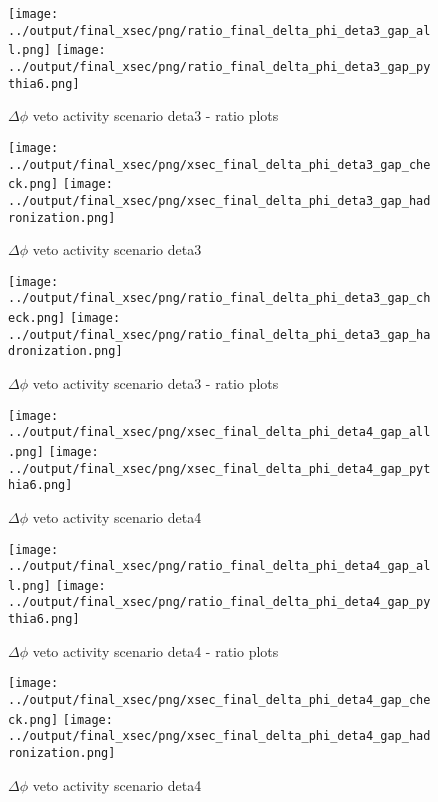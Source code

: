 \documentclass[11pt]{article}
\begin{document}
\begin{figure}[ht]
\centering
\texttt{[image: ../output/final\_xsec/png/ratio\_final\_delta\_phi\_deta3\_gap\_all.png]}
\texttt{[image: ../output/final\_xsec/png/ratio\_final\_delta\_phi\_deta3\_gap\_pythia6.png]}
\caption{$\Delta\phi$ veto activity scenario deta3 - ratio plots}
\label{fig:delta_phi_gap_deta3_ratio}
\end{figure}

\begin{figure}[ht]
\centering
\texttt{[image: ../output/final\_xsec/png/xsec\_final\_delta\_phi\_deta3\_gap\_check.png]}
\texttt{[image: ../output/final\_xsec/png/xsec\_final\_delta\_phi\_deta3\_gap\_hadronization.png]}
\caption{$\Delta\phi$ veto activity scenario deta3}
\label{fig:delta_phi_gap_deta3b}
\end{figure}

\begin{figure}[ht]
\centering
\texttt{[image: ../output/final\_xsec/png/ratio\_final\_delta\_phi\_deta3\_gap\_check.png]}
\texttt{[image: ../output/final\_xsec/png/ratio\_final\_delta\_phi\_deta3\_gap\_hadronization.png]}
\caption{$\Delta\phi$ veto activity scenario deta3 - ratio plots}
\label{fig:delta_phi_gap_deta3b_ratio}
\end{figure}

\begin{figure}[ht]
\centering
\texttt{[image: ../output/final\_xsec/png/xsec\_final\_delta\_phi\_deta4\_gap\_all.png]}
\texttt{[image: ../output/final\_xsec/png/xsec\_final\_delta\_phi\_deta4\_gap\_pythia6.png]}
\caption{$\Delta\phi$ veto activity scenario deta4}
\label{fig:delta_phi_gap_deta4}
\end{figure}

\begin{figure}[ht]
\centering
\texttt{[image: ../output/final\_xsec/png/ratio\_final\_delta\_phi\_deta4\_gap\_all.png]}
\texttt{[image: ../output/final\_xsec/png/ratio\_final\_delta\_phi\_deta4\_gap\_pythia6.png]}
\caption{$\Delta\phi$ veto activity scenario deta4 - ratio plots}
\label{fig:delta_phi_gap_deta4_ratio}
\end{figure}

\begin{figure}[ht]
\centering
\texttt{[image: ../output/final\_xsec/png/xsec\_final\_delta\_phi\_deta4\_gap\_check.png]}
\texttt{[image: ../output/final\_xsec/png/xsec\_final\_delta\_phi\_deta4\_gap\_hadronization.png]}
\caption{$\Delta\phi$ veto activity scenario deta4}
\label{fig:delta_phi_gap_deta4b}
\end{figure}
\end{document}
